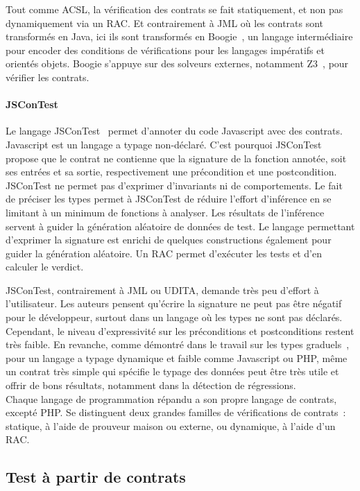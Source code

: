 Tout comme ACSL, la vérification des contrats se fait statiquement, et non pas
dynamiquement via un RAC. Et contrairement à JML où les contrats sont
transformés en Java, ici ils sont transformés en Boogie~,
un langage intermédiaire pour encoder des conditions de vérifications pour les
langages impératifs et orientés objets. Boogie s'appuye sur des solveurs
externes, notamment Z3~, pour vérifier les contrats.

\paragraph{JSConTest} Le langage JSConTest~\acite{} permet d'annoter du code
Javascript avec des contrats. Javascript est un langage a typage non-déclaré.
C'est pourquoi JSConTest propose que le contrat ne contienne que la signature de
la fonction annotée, soit ses entrées et sa sortie, respectivement une
précondition et une postcondition. JSConTest ne permet pas d'exprimer
d'invariants ni de comportements. Le fait de préciser les types permet à
JSConTest de réduire l'effort d'inférence en se limitant à un minimum de
fonctions à analyser. Les résultats de l'inférence servent à guider la
génération aléatoire de données de test. Le langage permettant d'exprimer la
signature est enrichi de quelques constructions également pour guider la
génération aléatoire. Un RAC permet d'exécuter les tests et d'en calculer le
verdict.

JSConTest, contrairement à JML ou UDITA, demande très peu d'effort à
l'utilisateur. Les auteurs pensent qu'écrire la signature ne peut pas être
négatif pour le développeur, surtout dans un langage où les types ne sont pas
déclarés. Cependant, le niveau d'expressivité sur les préconditions et
postconditions restent très faible. En revanche, comme démontré dans le travail
sur les types graduels~, pour un langage a typage dynamique et
faible comme Javascript ou PHP, même un contrat très simple qui spécifie le
typage des données peut être très utile et offrir de bons résultats, notamment
dans la détection de régressions. \\

Chaque langage de programmation répandu a son propre langage de contrats,
excepté PHP. Se distinguent deux grandes familles de vérifications de contrats~:
statique, à l'aide de prouveur maison ou externe, ou dynamique, à l'aide d'un
RAC.

\subsection{Test à partir de contrats}
\label{subsection:sota:cbt}

